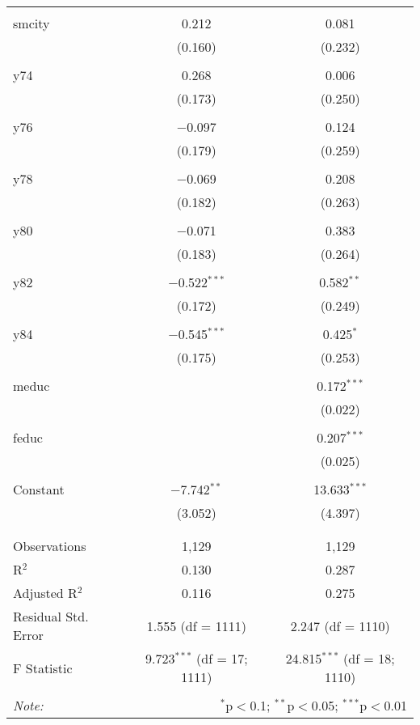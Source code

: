 \documentclass[11pt]{article} %
\begin{document}
\begin{table}[!htbp]
\begin{tabular}{@{\extracolsep{5pt}}lcc}
    & & \\ 
   smcity & 0.212 & 0.081 \\ 
    & (0.160) & (0.232) \\ 
    & & \\ 
   y74 & 0.268 & 0.006 \\ 
    & (0.173) & (0.250) \\ 
    & & \\ 
   y76 & $-$0.097 & 0.124 \\ 
    & (0.179) & (0.259) \\ 
    & & \\ 
   y78 & $-$0.069 & 0.208 \\ 
    & (0.182) & (0.263) \\ 
    & & \\ 
   y80 & $-$0.071 & 0.383 \\ 
    & (0.183) & (0.264) \\ 
    & & \\ 
   y82 & $-$0.522$^{***}$ & 0.582$^{**}$ \\ 
    & (0.172) & (0.249) \\ 
    & & \\ 
   y84 & $-$0.545$^{***}$ & 0.425$^{*}$ \\ 
    & (0.175) & (0.253) \\ 
    & & \\ 
   meduc &  & 0.172$^{***}$ \\ 
    &  & (0.022) \\ 
    & & \\ 
   feduc &  & 0.207$^{***}$ \\ 
    &  & (0.025) \\ 
    & & \\ 
   Constant & $-$7.742$^{**}$ & 13.633$^{***}$ \\ 
    & (3.052) & (4.397) \\ 
    & & \\ 
  \hline \\[-1.8ex] 
  Observations & 1,129 & 1,129 \\ 
  R$^{2}$ & 0.130 & 0.287 \\ 
  Adjusted R$^{2}$ & 0.116 & 0.275 \\ 
  Residual Std. Error & 1.555 (df = 1111) & 2.247 (df = 1110) \\ 
  F Statistic & 9.723$^{***}$ (df = 17; 1111) & 24.815$^{***}$ (df = 18; 1110) \\ 
  \hline 
  \hline \\[-1.8ex] 
  \textit{Note:}  & \multicolumn{2}{r}{$^{*}$p$<$0.1; $^{**}$p$<$0.05; $^{***}$p$<$0.01} \\ 
  \end{tabular} 
  \end{table} 
\end{document}
